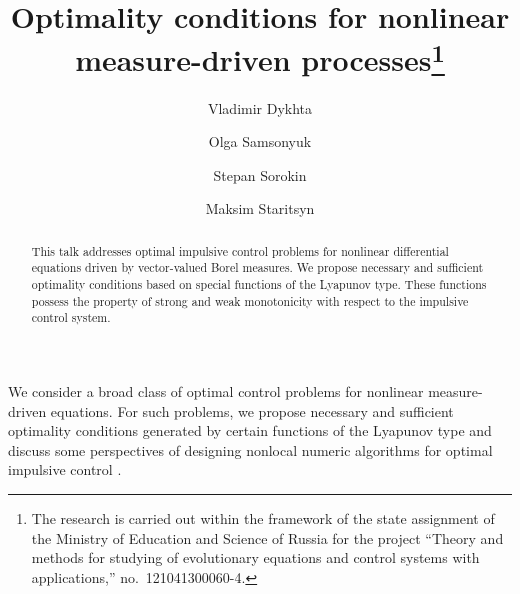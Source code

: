 \documentclass[12pt]{llncs}
\begin{document}
\fi

\title{Optimality conditions for nonlinear\\ measure-driven processes\thanks{The research is carried out within the framework of the state assignment of the Ministry of Education and Science of Russia for the project ``Theory and methods for studying  of evolutionary equations and control systems with applications,'' no.~121041300060-4.
}
}

\author{Vladimir Dykhta \and Olga Samsonyuk \and
 Stepan Sorokin \and
 Maksim Staritsyn
}

\maketitle

\begin{abstract}
This talk addresses optimal impulsive control problems for nonlinear differential equations driven by vector-valued Borel measures. We propose necessary and sufficient optimality conditions based on special functions of the Lyapunov type. These functions possess the property of strong and weak monotonicity with respect to the impulsive control system.

\end{abstract}



We consider a broad class of optimal control problems for nonlinear measure-driven equations. For such problems, we propose ne\-ces\-sa\-ry and sufficient optimality conditions generated by certain functions of the Lyapunov type and discuss some perspectives of designing  nonlocal numeric algorithms for optimal impulsive control \cite{nlaDykh2022,nlaDykh2016,nlaDykhSam2018IFAC,nlaSam2020JOGO,nlaSamSorStar2019,nlaSamSorStar2019Motor}.  
\end{document}
